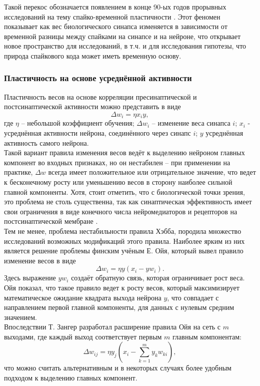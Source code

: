 \documentclass[a4paper,10pt]{article}
\begin{document}
\indent Такой перекос обозначается появлением в конце 90-ых годов прорывных исследований на тему спайко-временной пластичности \cite{stdp1,stdp2,stdp3,stdp4}. Этот феномен показывает как вес биологического синапса изменяется в зависимости от временной разницы между спайками на синапсе и на нейроне, что открывает новое пространство для исследований, в т.ч. и для исследования гипотезы, что природа спайкового кода может иметь временную основу.\\

\subsubsection{Пластичность на основе усреднённой активности}
\indent Пластичность весов на основе корреляции пресинаптической и постсинаптической активности можно представить в виде
\begin{equation}
\Delta w_{i} = \eta x_{i}y,
\end{equation}
где $\eta$ -- небольшой коэффициент обучения; $\Delta w_{i}$ -- изменение веса синапса $i$; $x_{i}$ - усреднённая активности нейрона, соединённого через синапс $i$; $y$ усреднённая активность самого нейрона.\\
\indent Такой вариант правила изменения весов ведёт к выделению нейроном главных компонент \cite{anderson1963} во входных признаках, но он нестабилен -- при применении на практике, $\Delta w$ всегда имеет положительное или отрицательное значение, что ведет к бесконечному росту или уменьшению весов в сторону наиболее сильной главной компоненты. Хотя, стоит отметить, что с биологической точки зрения, это проблема не столь существенна, так как синаптическая эффективность имеет свои ограничения в виде конечного числа нейромедиаторов и рецепторов на постсинаптической мембране \cite{NeuralAndAdaptiveSystems}.\\
\indent Тем не менее, проблема нестабильности правила Хэбба, породила множество исследований возможных модификаций этого правила. Наиболее ярким из них является решение проблемы финским учёным Е. Ойя, который вывел правило изменение весов в виде
\begin{equation}
\Delta w_{i} = \eta y (x_{i} - yw_{i}).
\end{equation}
Здесь выражение $yw_{i}$ создаёт обратную связь, которая ограничивает рост веса. Ойя показал, что такое правило ведет к росту весов, который максимизирует математическое ожидание квадрата выхода нейрона $y$, что совпадает с направлением первой главной компоненты, для данных с нулевым средним значением.\\
\indent Впоследствии Т. Зангер разработал расширение правила Ойя на сеть с $m$ выходами, где каждый выход соответствует первым $m$ главным компонентам:
\begin{equation}
\Delta w_{ij} = \eta y_{j} (x_{i} - \sum_{k=1}^{m}y_{k}w_{ki}),
\end{equation}
что можно считать альтернативным и в некоторых случаях более удобным подходом к выделению главных компонент.
\end{document}
